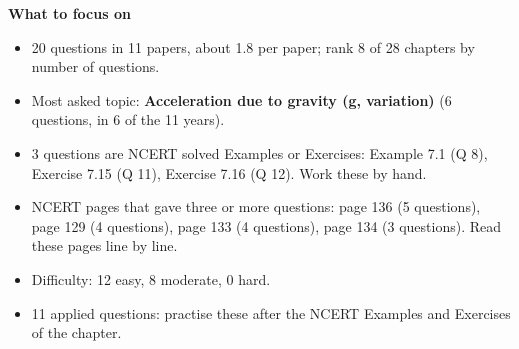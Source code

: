 \begin{minipage}[t]{0.63\linewidth}{\small\textbf{\color{crimson}What to focus on}\par\smallskip
\begin{itemize}[leftmargin=1.1em,itemsep=1pt,topsep=0pt]
\item 20 questions in 11 papers, about 1.8 per paper; rank 8 of 28 chapters by number of questions.
\item Most asked topic: \textbf{Acceleration due to gravity (g, variation)} (6 questions, in 6 of the 11 years).
\item 3 questions are NCERT solved Examples or Exercises: Example 7.1 (Q 8), Exercise 7.15 (Q 11), Exercise 7.16 (Q 12). Work these by hand.
\item NCERT pages that gave three or more questions: page 136 (5 questions), page 129 (4 questions), page 133 (4 questions), page 134 (3 questions). Read these pages line by line.
\item Difficulty: 12 easy, 8 moderate, 0 hard.
\item 11 applied questions: practise these after the NCERT Examples and Exercises of the chapter.
\end{itemize}}\end{minipage}\par
{}
